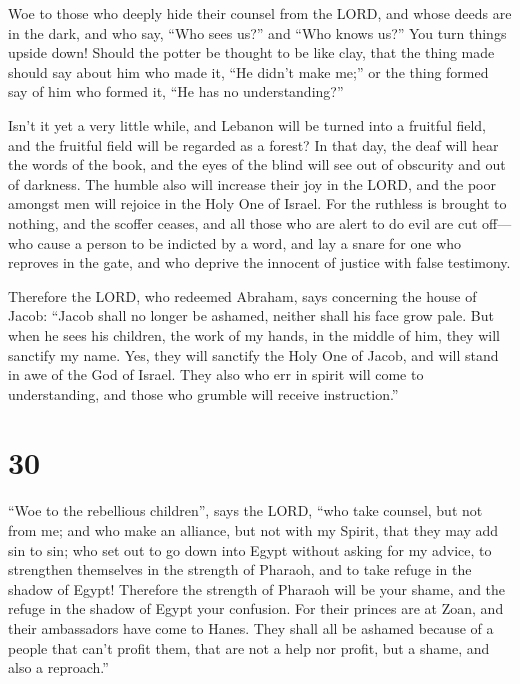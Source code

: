  Woe to those who deeply hide their counsel from the LORD,
and whose deeds are in the dark, and who say, ``Who sees us?'' and ``Who
knows us?''  You turn things upside down! Should the potter
be thought to be like clay, that the thing made should say about him who
made it, ``He didn't make me;'' or the thing formed say of him who
formed it, ``He has no understanding?''

 Isn't it yet a very little while, and Lebanon will be
turned into a fruitful field, and the fruitful field will be regarded as
a forest?  In that day, the deaf will hear the words of the
book, and the eyes of the blind will see out of obscurity and out of
darkness.  The humble also will increase their joy in the
LORD, and the poor amongst men will rejoice in the Holy One of Israel.
 For the ruthless is brought to nothing, and the scoffer
ceases, and all those who are alert to do evil are cut off---
 who cause a person to be indicted by a word, and lay a
snare for one who reproves in the gate, and who deprive the innocent of
justice with false testimony.

 Therefore the LORD, who redeemed Abraham, says concerning
the house of Jacob: ``Jacob shall no longer be ashamed, neither shall
his face grow pale.  But when he sees his children, the
work of my hands, in the middle of him, they will sanctify my name. Yes,
they will sanctify the Holy One of Jacob, and will stand in awe of the
God of Israel.  They also who err in spirit will come to
understanding, and those who grumble will receive instruction.''

\hypertarget{section-29}{%
\section{30}\label{section-29}}

 ``Woe to the rebellious children'', says the LORD, ``who
take counsel, but not from me; and who make an alliance, but not with my
Spirit, that they may add sin to sin;  who set out to go
down into Egypt without asking for my advice, to strengthen themselves
in the strength of Pharaoh, and to take refuge in the shadow of Egypt!
 Therefore the strength of Pharaoh will be your shame, and
the refuge in the shadow of Egypt your confusion.  For their
princes are at Zoan, and their ambassadors have come to Hanes.
 They shall all be ashamed because of a people that can't
profit them, that are not a help nor profit, but a shame, and also a
reproach.''

